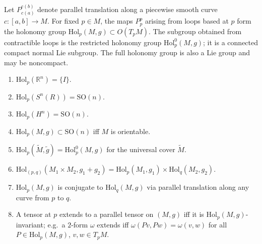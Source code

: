 \begin{definition}
  \label{def:pet-ch10-holonomy-group}
  Let $P_{c(a)}^{c(b)}$ denote parallel translation along a piecewise smooth
  curve $c:[a,b]\to M$. For fixed $p\in M$, the maps $P_p^p$ arising from loops
  based at $p$ form the holonomy group
  $\mathrm{Hol}_p(M,g)\subset O(T_pM)$. The subgroup obtained from contractible
  loops is the restricted holonomy group $\mathrm{Hol}_p^0(M,g)$; it is a
  connected compact normal Lie subgroup. The full holonomy group is also a Lie
  group and may be noncompact.
\end{definition}

\begin{remark}
  \label{rem:pet-ch10-holonomy-properties}
  \begin{enumerate}
    \item[(a)] $\mathrm{Hol}_p(\mathbb R^n)=\{I\}$.
    \item[(b)] $\mathrm{Hol}_p(S^n(R))=\mathrm{SO}(n)$.
    \item[(c)] $\mathrm{Hol}_p(H^n)=\mathrm{SO}(n)$.
    \item[(d)] $\mathrm{Hol}_p(M,g)\subset\mathrm{SO}(n)$ iff $M$ is orientable.
    \item[(e)] $\mathrm{Hol}_p(\widetilde M,\widetilde g)=\mathrm{Hol}_p^0(M,g)$ for the
      universal cover $\widetilde M$.
    \item[(f)] $\mathrm{Hol}_{(p,q)}(M_1\times M_2,g_1+g_2)=\mathrm{Hol}_p(M_1,g_1)\times\mathrm{Hol}_q(M_2,g_2)$.
    \item[(g)] $\mathrm{Hol}_p(M,g)$ is conjugate to $\mathrm{Hol}_q(M,g)$ via parallel
      translation along any curve from $p$ to $q$.
    \item[(h)] A tensor at $p$ extends to a parallel tensor on $(M,g)$ iff it is
      $\mathrm{Hol}_p(M,g)$-invariant; e.g.\ a $2$-form $\omega$ extends iff
      $\omega(Pv,Pw)=\omega(v,w)$ for all $P\in\mathrm{Hol}_p(M,g)$,
      $v,w\in T_pM$.
  \end{enumerate}
\end{remark}


